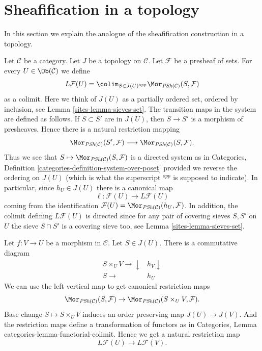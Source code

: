 \section{Sheafification in a topology}
\label{sites-section-sheafification-topology}
In this section we explain the analogue of the
sheafification construction in a topology.

\medskip\noindent
Let $\mathcal{C}$ be a category.
Let $J$ be a topology on $\mathcal{C}$.
Let $\mathcal{F}$ be a presheaf of sets.
For every $U \in \Ob(\mathcal{C})$ we
define
$$
L\mathcal{F}(U)
=
\colim_{S \in J(U)^{opp}}
\Mor_{\textit{PSh}(\mathcal{C})}(S, \mathcal{F})
$$
as a colimit. Here we think of $J(U)$ as a partially ordered set,
ordered by inclusion, see Lemma \ref{sites-lemma-sieves-set}. The transition
maps in the system are defined as follows.
If $S \subset S'$ are in $J(U)$, then $S \to S'$ is
a morphism of presheaves. Hence there is a natural restriction
mapping
$$
\Mor_{\textit{PSh}(\mathcal{C})}(S', \mathcal{F})
\longrightarrow
\Mor_{\textit{PSh}(\mathcal{C})}(S, \mathcal{F}).
$$
Thus we see that
$S \mapsto \Mor_{\textit{PSh}(\mathcal{C})}(S, \mathcal{F})$
is a directed system as in Categories,
Definition \ref{categories-definition-system-over-poset}
provided we reverse the ordering
on $J(U)$ (which is what the superscript ${}^{opp}$ is supposed to
indicate). In particular, since $h_U \in J(U)$
there is a canonical map
$$
\ell : \mathcal{F}(U) \longrightarrow L\mathcal{F}(U)
$$
coming from the identification
$\mathcal{F}(U) = \Mor_{\textit{PSh}(\mathcal{C})}(h_U, \mathcal{F})$.
In addition, the colimit defining $L\mathcal{F}(U)$ is directed
since for any pair of covering sieves $S, S'$ on $U$ the
sieve $S \cap S'$ is a covering sieve too, see Lemma \ref{sites-lemma-sieves-set}.

\medskip\noindent
Let $f : V \to U$ be a morphism in $\mathcal{C}$.
Let $S \in J(U)$. There is a commutative diagram
$$
\begin{array}{cc}S \times_U V \longrightarrow\downarrow & h_V \downarrow \\ S \longrightarrow & h_U\end{array}
$$
We can use the left vertical map to get canonical restriction maps
$$
\Mor_{\textit{PSh}(\mathcal{C})}(S, \mathcal{F})
\to \Mor_{\textit{PSh}(\mathcal{C})}(S \times_U V, \mathcal{F}).
$$
Base change $S \mapsto S \times_U V$ induces an order
preserving map $J(U) \to J(V)$. And the restriction maps
define a transformation of functors as in
Categories, Lemma {categories-lemma-functorial-colimit}.
Hence we get a natural restriction map
$$
L\mathcal{F}(U) \longrightarrow L\mathcal{F}(V).
$$

